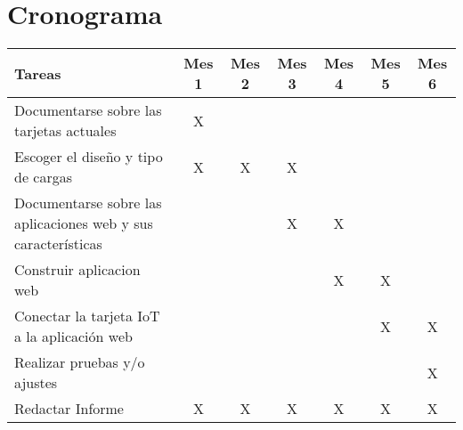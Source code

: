 \chapter{Cronograma}

\begin{comment}

Revisar la duración de acuerdo a 5 creditos

1 credito = 3Horas/semana

5 creditos = 15 Horas/semana

6 meses = 24 semanas = 360 horas

Tareas: Objetivo E 1

- Documentarse sobre las tarjetas actuales
- Conocer las tarjetas con características clave (como conectividad inalámbrica)
- Analizar sus características técnicas
- Decidir por la más conveniente

- Escoger el diseño y tipo de cargas
- Plantear un entorno “común” (según encuesta?) con elementos comunes de una habitación
- Determinar las cargas que presenten mayor necesidad de ser controladas/automatizadas
- Diseñar etapas de potencia requeridas para las cargas
- Realizar simulaciones
- Construir y evaluar prototipos

Tareas: Objetivo E 2

- Documentarse sobre las aplicaciones web y sus características
- Conocer diferentes servidores web y que protocolos/lenguajes son compatibles
- Comparar y decidir sobre los servidores web
- Documentarse sobre los protocolos/lenguajes a implementar
- Construir aplicacion web
- Diseñar una interfaz de usuario amigable e intuitiva
- Conectar la tarjeta IoT a la aplicación web
- Verificar lectura, escritura e instrucciones en la conexión aplicación-tarjeta 

Tareas: Objetvo E 3

- Realizar pruebas y/o ajustes
- Verificar requerimientos
- Corregir fallos y/o comportamientos indeseados o inestables


Tareas: Documento

Redactar Informe
\end{comment}


\begin{tabular}{|p{6cm}|c|c|c|c|c|c|}
	\hline 
	\textbf{Tareas} & Mes 1 & Mes 2 & Mes 3 & Mes 4 & Mes 5 & Mes 6 \\ 
	\hline 
	Documentarse sobre las tarjetas actuales
	& X &  &  &  &  &  \\ 
	\hline 
	Escoger el diseño y tipo de cargas
	& X & X & X &  &  &  \\ 
	\hline 
	Documentarse sobre las aplicaciones web y sus características
	&  &  & X & X &  &  \\ 
	\hline 
	Construir aplicacion web 
	&  &  &  & X & X &  \\ 
	\hline 
	Conectar la tarjeta IoT a la aplicación web
	&  &  &  &  & X & X \\ 
	\hline 
	Realizar pruebas y/o ajustes
	&  &  &  &  &  & X \\ 
	\hline 
	Redactar Informe & X & X & X & X & X & X \\ 
	\hline 
\end{tabular} 